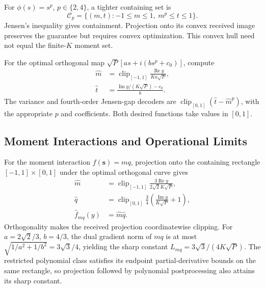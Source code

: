 For $\phi(s)=s^p$, $p\in\{2,4\}$, a tighter containing set is
$$\mathcal C_p=\{(m,t):-1\le m\le1,\ m^p\le t\le1\}.$$
Jensen's inequality gives containment. Projection onto its convex received image preserves the guarantee but requires convex optimization. This convex hull need not equal the finite-$K$ moment set.

For the optimal orthogonal map $\sqrt P[a s+i(bs^p+c_0)]$, compute
\begin{align*}
 \widehat m&=\operatorname{clip}_{[-1,1]}\frac{\operatorname{Re}y}{Ka\sqrt P},\\
 \widehat t&=\frac{\operatorname{Im}y/(K\sqrt P)-c_0}{b}.
\end{align*}
The variance and fourth-order Jensen-gap decoders are $\operatorname{clip}_{[0,1]}(\widehat t-\widehat m^p)$, with the appropriate $p$ and coefficients. Both desired functions take values in $[0,1]$.

\subsection{Moment Interactions and Operational Limits}
For the moment interaction $f(\mathbf s)=m q$, projection onto the containing rectangle $[-1,1]\times[0,1]$ under the optimal orthogonal curve gives
\begin{equation}\begin{aligned}
 \widehat m&=\operatorname{clip}_{[-1,1]}\frac{3\operatorname{Re}y}{2\sqrt2K\sqrt P},\\
 \widehat q&=\operatorname{clip}_{[0,1]}\frac34\left(\frac{\operatorname{Im}y}{K\sqrt P}+1\right),\\
 \widehat f_{mq}(y)&=\widehat m\widehat q.
\end{aligned}\label{eq:mqdecoder}\end{equation}
Orthogonality makes the received projection coordinatewise clipping. For $a=2\sqrt2/3$, $b=4/3$, the dual gradient norm of $mq$ is at most $\sqrt{1/a^2+1/b^2}=3\sqrt3/4$, yielding the sharp constant $L_{mq}=3\sqrt3/(4K\sqrt P)$. The restricted polynomial class satisfies its endpoint partial-derivative bounds on the same rectangle, so projection followed by polynomial postprocessing also attains its sharp constant.


